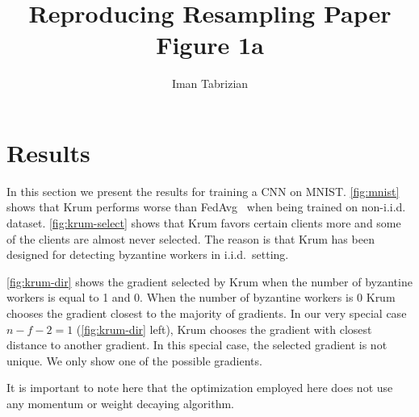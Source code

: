 \documentclass[11pt]{article}
\title{Reproducing Resampling Paper Figure 1a}
\author{Iman Tabrizian}
\begin{document}
\maketitle

\section{Results}

In this section we present the results for training a CNN on MNIST.
\cref{fig:mnist} shows that Krum\cite{krum} performs worse than
FedAvg~\cite{fedavg} when being trained on non-i.i.d.  dataset.
\cref{fig:krum-select} shows that Krum favors certain clients more and some of
the clients are almost never selected.  The reason is that Krum has been
designed for detecting byzantine workers in i.i.d.\ setting.

\cref{fig:krum-dir} shows the gradient selected by Krum when the number of
byzantine workers is equal to 1 and 0. When the number of byzantine workers is 0
Krum chooses the gradient closest to the majority of gradients. In our very
special case $n-f-2=1$ (\cref{fig:krum-dir} left), Krum chooses the gradient
with closest distance to another gradient. In this special case, the selected
gradient is not unique. We only show one of the possible gradients.

It is important to note here that the optimization employed here does not use
any momentum or weight decaying algorithm. 
\end{document}
